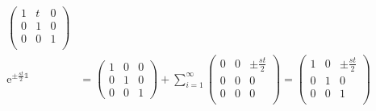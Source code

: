 \documentclass[]{ctexart}
\newcommand{\me}{\mathrm{e}}
\begin{document}
\begin{equation*}
\begin{aligned}
\begin{pmatrix}
				1 &  t & 0 \\
				0 & 1 & 0 \\
				0 & 0 & 1 \\
				\end{pmatrix}\\
				\me ^{\pm\frac{st}{2}\mathds{1}}&=
				\begin{pmatrix}
				1 & 0 &  0 \\
				0 & 1 &  0\\
				0 & 0 & 1
				\end{pmatrix}
				+\sum_{i=1}^{\infty}
				\begin{pmatrix}
				0 &  0 & \pm\frac{st}{2} \\
				0 & 0 & 0\\
				0 & 0 & 0 \\
				\end{pmatrix}
				=
				\begin{pmatrix}
				1 &  0 & \pm\frac{st}{2} \\
				0 & 1 & 0 \\
				0 & 0 & 1 \\
				\end{pmatrix}
			\end{aligned}
			\end{equation*}
		
\end{document}
